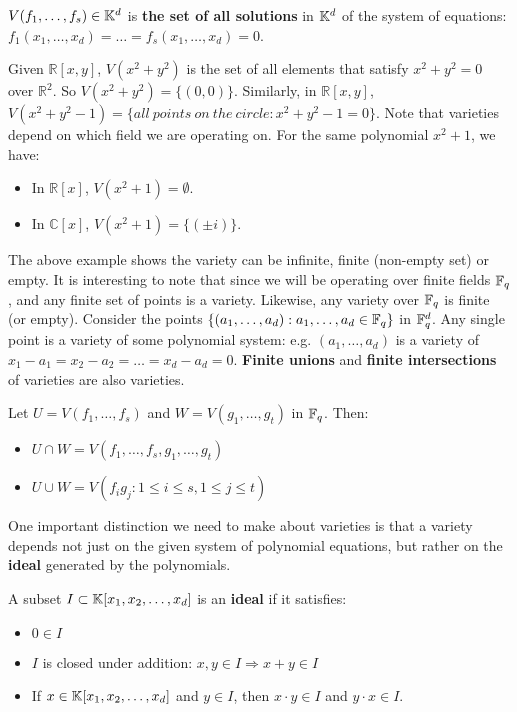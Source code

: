 $V(f_1, \dots, f_s)\in {\mathbb{K}}^d$ is {\bf the set of all solutions} in ${\mathbb{K}}^d$ 
of the system of equations: 
$f_1(x_1,\ldots,x_d)=\dots=f_s(x_1,\dots,x_d)=0$. 

\begin{Example}
Given $\mathbb{R}\left[x,y\right]$, $V(x^2+y^2)$ is the set of all elements
that satisfy $x^2+y^2=0$ over $\mathbb{R}^2$. So $V(x^2+y^2)=\{(0,0)\}$. 
Similarly, in $\mathbb{R}\left[x,y\right]$, $V(x^2+y^2-1)=\{all\  points\  on\ the\ circle: x^2+y^2-1=0\}$.
Note that varieties depend on which field we are operating on. 
For the same polynomial $x^2+1$, we have:
\begin{itemize}
\item In $\mathbb{R}[x]$, $V(x^2+1)=\emptyset$.
\item In $\mathbb{C}[x]$, $V(x^2+1)=\{(\pm i)\}$.
\end{itemize}
\end{Example}

The above example shows the variety can be infinite, finite (non-empty set) 
or empty. It is interesting to note that since we will be operating over
finite fields ${\mathbb{F}}_{q}$, and any finite set of points is a variety. Likewise,
any variety over ${\mathbb{F}}_{q}$ is finite (or empty).
Consider the points $\{(a_1,\dots, a_d): a_1, \dots, a_d \in {\mathbb{F}}_q\}$
in ${\mathbb{F}}_q^d$. Any single point is a variety of some polynomial system:
e.g. $(a_1,\dots, a_d)$ is a variety of $x_1-a_1 = x_2 - a_2 = \dots =
x_d-a_d=0$. {\bf Finite unions} and {\bf finite  intersections} of
varieties are also varieties. 

\begin{Example}
Let $U = V(f_1, \dots, f_s)$ and $W =
V(g_1, \dots, g_t)$ in ${\mathbb{F}}_{q}$. Then:  
\begin{itemize}
\item $U \cap W = V(f_1, \dots, f_s, g_1, \dots, g_t)$
\item $U \cup W = V(f_i g_j: 1 \leq i \leq s, 1 \leq j \leq t)$
\end{itemize}
\end{Example}

One important distinction we need to make about varieties is that a
variety depends not just on the given system of polynomial 
equations, but rather on the {\bf ideal} generated by the polynomials.

\begin{Definition} 
A subset $I \subset {\mathbb{K}}[x_1, x_2, \ldots, x_d]$ is an {
\bf ideal} if it satisfies:
\begin{itemize}
\item $0 \in I$
\item $I$ is closed under addition: $x, y \in I \Rightarrow x+y \in I$
\item If $x \in {\mathbb{K}}[x_1, x_2, \ldots, x_d]$ and $y \in I$, then $x\cdot y \in I$ and $y\cdot x \in  I$.
\end{itemize}
\end{Definition}

